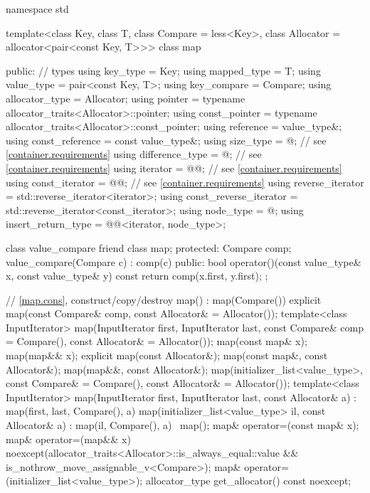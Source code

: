 \begin{codeblock}
namespace std {
  template<class Key, class T, class Compare = less<Key>,
           class Allocator = allocator<pair<const Key, T>>>
  class map {
  public:
    // types
    using key_type               = Key;
    using mapped_type            = T;
    using value_type             = pair<const Key, T>;
    using key_compare            = Compare;
    using allocator_type         = Allocator;
    using pointer                = typename allocator_traits<Allocator>::pointer;
    using const_pointer          = typename allocator_traits<Allocator>::const_pointer;
    using reference              = value_type&;
    using const_reference        = const value_type&;
    using size_type              = @\impdef@; // see \ref{container.requirements}
    using difference_type        = @\impdef@; // see \ref{container.requirements}
    using iterator               = @@; // see \ref{container.requirements}
    using const_iterator         = @@; // see \ref{container.requirements}
    using reverse_iterator       = std::reverse_iterator<iterator>;
    using const_reverse_iterator = std::reverse_iterator<const_iterator>;
    using node_type              = @\unspec@;
    using insert_return_type     = @@<iterator, node_type>;

    class value_compare {
      friend class map;
    protected:
      Compare comp;
      value_compare(Compare c) : comp(c) {}
    public:
      bool operator()(const value_type& x, const value_type& y) const {
        return comp(x.first, y.first);
      }
    };

    // \ref{map.cons}, construct/copy/destroy
    map() : map(Compare()) { }
    explicit map(const Compare& comp, const Allocator& = Allocator());
    template<class InputIterator>
      map(InputIterator first, InputIterator last,
          const Compare& comp = Compare(), const Allocator& = Allocator());
    map(const map& x);
    map(map&& x);
    explicit map(const Allocator&);
    map(const map&, const Allocator&);
    map(map&&, const Allocator&);
    map(initializer_list<value_type>,
      const Compare& = Compare(),
      const Allocator& = Allocator());
    template<class InputIterator>
      map(InputIterator first, InputIterator last, const Allocator& a)
        : map(first, last, Compare(), a) { }
    map(initializer_list<value_type> il, const Allocator& a)
      : map(il, Compare(), a) { }
    ~map();
    map& operator=(const map& x);
    map& operator=(map&& x)
      noexcept(allocator_traits<Allocator>::is_always_equal::value &&
               is_nothrow_move_assignable_v<Compare>);
    map& operator=(initializer_list<value_type>);
    allocator_type get_allocator() const noexcept;

}}
\end{codeblock}
